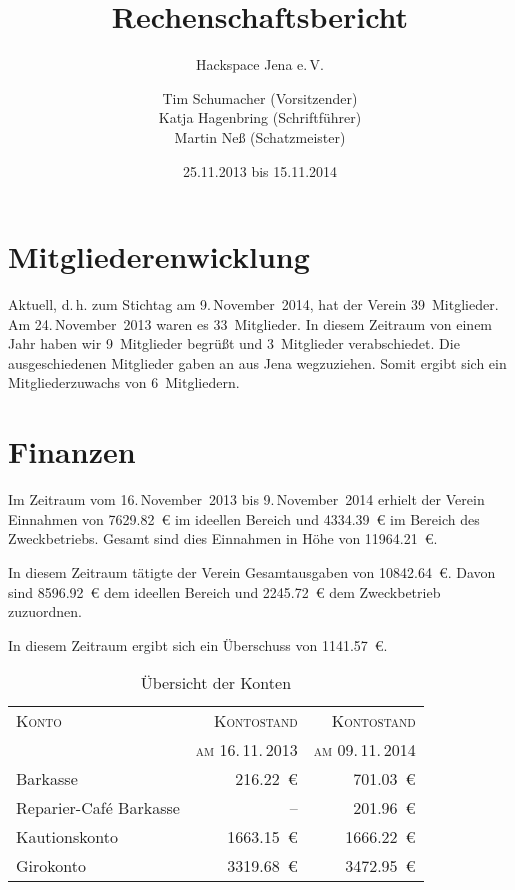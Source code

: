 \documentclass[ngerman]{scrartcl}
\title{Rechenschaftsbericht}
\subtitle{Hackspace Jena e.\,V.}
\author{%
	Tim Schumacher (Vorsitzender)\\
	Katja Hagenbring (Schriftführer)\\
	Martin Neß (Schatzmeister)
}
\date{25.11.2013 bis 15.11.2014}
\begin{document}
\maketitle{}

\tableofcontents{}

\newpage{}

\section{Mitgliederenwicklung}

Aktuell, d.\,h. zum Stichtag am  9.\,November~2014, hat der Verein 39~Mitglieder. Am 24.\,November~2013 waren es 33~Mitglieder.
In diesem Zeitraum von einem Jahr haben wir 9~Mitglieder begrüßt und 3~Mitglieder verabschiedet. Die ausgeschiedenen Mitglieder gaben an aus Jena wegzuziehen.
Somit ergibt sich ein Mitgliederzuwachs von 6~Mitgliedern.

\section{Finanzen}

Im Zeitraum vom 16.\,November~2013 bis 9.\,November~2014 erhielt der Verein Einnahmen von \num{7629,82}~\euro{} im ideellen Bereich und \num{4334,39}~\euro{} im Bereich des Zweckbetriebs.
Gesamt sind dies Einnahmen in Höhe von \num{11964,21}~\euro{}.


In diesem Zeitraum tätigte der Verein Gesamtausgaben von \num{10842,64}~\euro{}. Davon sind \num{8596,92}~\euro{} dem ideellen Bereich und \num{2245,72}~\euro{}  dem Zweckbetrieb zuzuordnen.

In diesem Zeitraum ergibt sich ein Überschuss von \num{1141,57}~\euro{}.

\begin{table}[h!]
  \centering{}
	\begin{tabular}{l|r|r}
          \toprule
	\textsc{Konto} & \textsc{Kontostand} & \textsc{Kontostand}\\
                        & \textsc{am 16.\,11.\,2013} &  \textsc{am 09.\,11.\,2014} \\
          \midrule
	Barkasse & \num{216,22}~\euro{} & \num{701,03}~\euro{} \\
	Reparier-Café Barkasse & -- & \num{201,96}~\euro{} \\
	Kautionskonto & \num{1663,15}~\euro{} & \num{1666,22}~\euro{} \\
	Girokonto & \num{3319,68}~\euro{} & \num{3472,95}~\euro{}\\ \bottomrule
	\end{tabular}
\caption{Übersicht der Konten}
\end{table}
\end{document}
